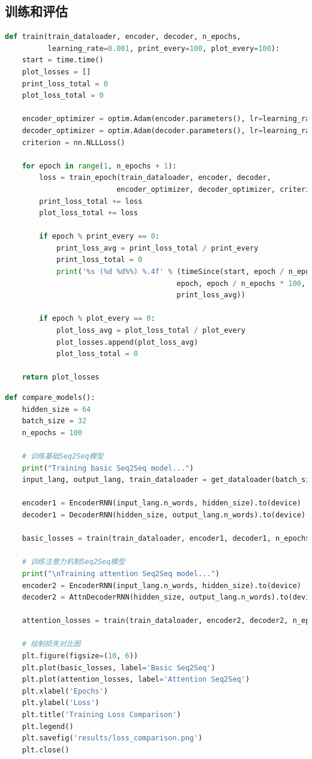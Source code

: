 \documentclass[a4paper]{article}
\begin{document}
\subsection{训练和评估}
\begin{lstlisting}[language=Python, caption=模型训练函数]
def train(train_dataloader, encoder, decoder, n_epochs, 
          learning_rate=0.001, print_every=100, plot_every=100):
    start = time.time()
    plot_losses = []
    print_loss_total = 0
    plot_loss_total = 0

    encoder_optimizer = optim.Adam(encoder.parameters(), lr=learning_rate)
    decoder_optimizer = optim.Adam(decoder.parameters(), lr=learning_rate)
    criterion = nn.NLLLoss()

    for epoch in range(1, n_epochs + 1):
        loss = train_epoch(train_dataloader, encoder, decoder, 
                          encoder_optimizer, decoder_optimizer, criterion)
        print_loss_total += loss
        plot_loss_total += loss

        if epoch % print_every == 0:
            print_loss_avg = print_loss_total / print_every
            print_loss_total = 0
            print('%s (%d %d%%) %.4f' % (timeSince(start, epoch / n_epochs),
                                        epoch, epoch / n_epochs * 100, 
                                        print_loss_avg))

        if epoch % plot_every == 0:
            plot_loss_avg = plot_loss_total / plot_every
            plot_losses.append(plot_loss_avg)
            plot_loss_total = 0

    return plot_losses
\end{lstlisting}

\begin{lstlisting}[language=Python, caption=模型对比函数]
def compare_models():
    hidden_size = 64
    batch_size = 32
    n_epochs = 100
    
    # 训练基础Seq2Seq模型
    print("Training basic Seq2Seq model...")
    input_lang, output_lang, train_dataloader = get_dataloader(batch_size)
    
    encoder1 = EncoderRNN(input_lang.n_words, hidden_size).to(device)
    decoder1 = DecoderRNN(hidden_size, output_lang.n_words).to(device)
    
    basic_losses = train(train_dataloader, encoder1, decoder1, n_epochs)
    
    # 训练注意力机制Seq2Seq模型
    print("\nTraining attention Seq2Seq model...")
    encoder2 = EncoderRNN(input_lang.n_words, hidden_size).to(device)
    decoder2 = AttnDecoderRNN(hidden_size, output_lang.n_words).to(device)
    
    attention_losses = train(train_dataloader, encoder2, decoder2, n_epochs)
    
    # 绘制损失对比图
    plt.figure(figsize=(10, 6))
    plt.plot(basic_losses, label='Basic Seq2Seq')
    plt.plot(attention_losses, label='Attention Seq2Seq')
    plt.xlabel('Epochs')
    plt.ylabel('Loss')
    plt.title('Training Loss Comparison')
    plt.legend()
    plt.savefig('results/loss_comparison.png')
    plt.close()
\end{lstlisting}
\end{document}
